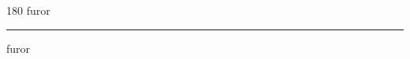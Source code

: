 
\begin{frame}
\begin{center}
\begin{turn}{180}
{\fontsize{2.5cm}{1em}\selectfont furor}
\end{turn}
\vspace{1em}\par  
\hrule
\vspace{1em}\par  
{\fontsize{2.5cm}{1em}\selectfont furor}
\end{center}
\end{frame}
